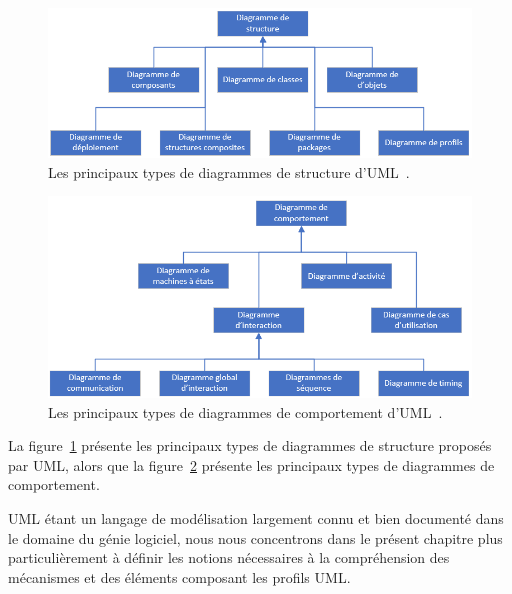  
\begin{figure}
    \centering
    \includegraphics[width=12cm]{10_img/chap4/structure.PNG}
    \caption{Les principaux types de diagrammes de structure d'UML~\cite{OMG_UML}.}
    \label{fig.uml_struc}
\end{figure}

\begin{figure}
    \centering
    \includegraphics[width=12cm]{10_img/chap4/comportement.PNG}
    \caption{Les principaux types de diagrammes de comportement d'UML~\cite{OMG_UML}.}
    \label{fig.uml_comp}
\end{figure}



La figure~\ref{fig.uml_struc} présente les principaux types de diagrammes de structure proposés par UML,
alors que la figure~\ref{fig.uml_comp} présente les principaux types de diagrammes de comportement.

UML \'etant un langage de modélisation largement connu et bien documenté dans le domaine du g\'enie logiciel,
nous nous concentrons dans le pr\'esent chapitre plus particulièrement à définir les notions nécessaires à la compréhension des mécanismes et des éléments composant les profils UML.



